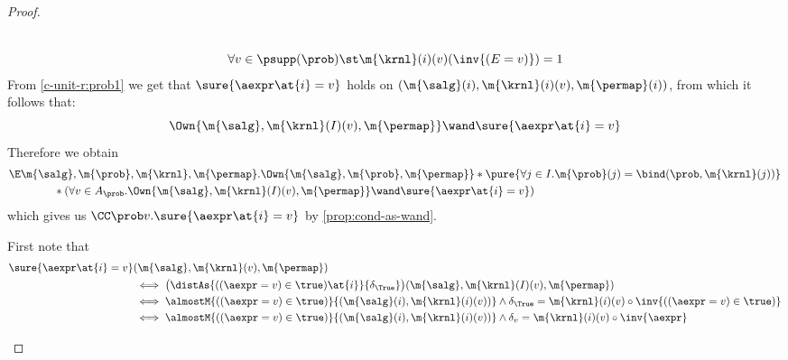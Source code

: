 \begin{proof}
\begin{casesplit}
\begin{gather}
      \label{c-unit-r:bind}
      \\
      \forall v\in \psupp(\prob)\st
        \m{\krnl}(i)(v)(\inv{(E=v)}) = 1
      \label{c-unit-r:prob1}
    \end{gather}
    From \eqref{c-unit-r:prob1} we get that
    $\sure{\aexpr\at{i} = v}$ holds on
    $(\m{\salg}(i), \m{\krnl}(i)(v), \m{\permap}(i))$,
    from which it follows that:
    \[
      \Own{\m{\salg}, \m{\krnl}(I)(v), \m{\permap}}
      \wand \sure{\aexpr\at{i} = v}
    \]
    Therefore we obtain
    \begin{align*}
      & \E \m{\salg},\m{\prob}, \m{\krnl}, \m{\permap}.
          \Own{\m{\salg},\m{\prob}, \m{\permap}} *
          \pure{\forall j \in I. \m{\prob}(j) = \bind(\prob, \m{\krnl}(j))} \\
      & \qquad \qquad  *
          (
            \forall v \in A_{\prob}.
              \Own{\m{\salg}, \m{\krnl}(I)(v), \m{\permap}}
              \wand \sure{\aexpr\at{i} = v}
          )
    \end{align*}
    which gives us $ \CC\prob v.\sure{\aexpr\at{i} = v} $
    by \cref{prop:cond-as-wand}.

\case*[Backward direction $\CC\prob v.\sure{\aexpr\at{i} = v} \proves \distAs{\aexpr\at{i}}{\prob}$]
    First note that
    \begin{align*}
      \sure{\aexpr\at{i} = v} &(\m{\salg}, \m{\krnl}(v), \m{\permap})
      \\
      &\iff
        \bigl(\distAs{((\aexpr = v) \in \true)\at{i}}{\delta_{\True}}\bigr)
          (\m{\salg}, \m{\krnl}(I)(v), \m{\permap})
      \\
      &\iff
        \almostM{((\aexpr = v) \in \true)}{(\m{\salg}(i), \m{\krnl}(i)(v))}
        \land
        \delta_{\True} =
          \m{\krnl}(i)(v) \circ \inv{((\aexpr = v) \in \true)}
      \\
      &\iff
        \almostM{((\aexpr = v) \in \true)}{(\m{\salg}(i), \m{\krnl}(i)(v))}
        \land
        \delta_{v} = \m{\krnl}(i)(v) \circ \inv{\aexpr}
    \end{align*}


\end{casesplit}
\end{proof}
